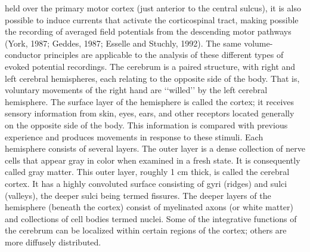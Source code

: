 held over the primary motor cortex (just anterior to the central sulcus), it is
also possible to induce currents that activate the corticospinal tract, making
possible the recording of averaged field potentials from the descending motor
pathways (York, 1987; Geddes, 1987; Esselle and Stuchly, 1992). The same
volume-conductor principles are applicable to the analysis of these different
types of evoked potential recordings. The cerebrum is a paired structure, with
right and left cerebral hemispheres, each relating to the opposite side of the
body. That is, voluntary movements of the right hand are ‘‘willed’’ by the left
cerebral hemisphere. The surface layer of the hemisphere is called the cortex;
it receives sensory information from skin, eyes, ears, and other receptors
located generally on the opposite side of the body. This information is
compared with previous experience and produces movements in response
to these stimuli.
Each hemisphere consists of several layers. The outer layer is a dense
collection of nerve cells that appear gray in color when examined in a fresh
state. It is consequently called gray matter. This outer layer, roughly 1 cm thick,
is called the cerebral cortex. It has a highly convoluted surface consisting of gyri
(ridges) and sulci (valleys), the deeper sulci being termed fissures. The deeper
layers of the hemisphere (beneath the cortex) consist of myelinated axons (or
white matter) and collections of cell bodies termed nuclei. Some of the
integrative functions of the cerebrum can be localized within certain regions
of the cortex; others are more diffusely distributed.

